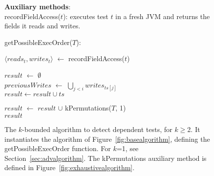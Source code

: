 \begin{figure}[t]
\textbf{Auxiliary methods}:\\
recordFieldAccess($\mathit{t}$): executes test $\mathit{t}$ in
a fresh JVM and returns the fields it reads and writes.\\


\smallsqueeze

getPossibleExecOrder($T$):\\
\bigsqueeze
\begin{algorithmic}[1]
\STATE $\langle \mathit{reads}_t, \mathit{writes}_t\rangle$ $\leftarrow$ recordFieldAccess($\mathit{t}$)\\ 
\ENDFOR

\STATE $\mathit{result}$ $\leftarrow$ $\emptyset$ \\
		\STATE $\mathit{previousWrites}$ $\leftarrow$ $\bigcup_{\mathit{j} < \mathit{i}}  \mathit{writes}_{\mathit{ts}[j]} $ \\
			\STATE $\mathit{result} \leftarrow \mathit{result} \cup \mathit{ts}$
		\ENDIF
	\ENDFOR

\ENDFOR
\STATE $\mathit{result}$ $\leftarrow$ $\mathit{result}$ $\cup$ kPermutations($\mathit{T}$, 1)\\
\RETURN $\mathit{result}$
\end{algorithmic}

\caption {The \dependenceaware{} $k$-bounded algorithm to detect dependent tests,
  for $k$$\ge$2.
It instantiates the algorithm of Figure~\ref{fig:basealgorithm}, defining the
getPossibleExecOrder function.
For $k$=1, see Section~\ref{sec:advalgorithm}.
The kPermutations auxiliary method is defined in Figure~\ref{fig:exhaustivealgorithm}.
} 
\label{fig:impralg}
\smallsqueeze
\smallsqueeze
\end{figure}

